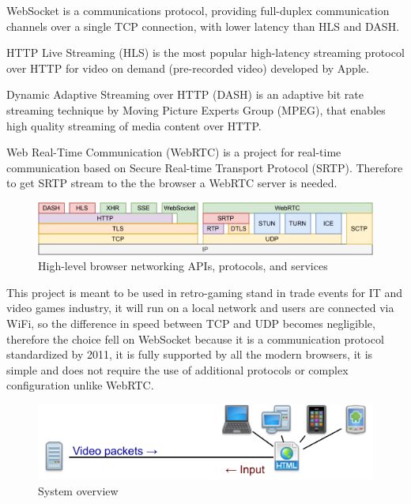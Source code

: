 WebSocket is a communications protocol, providing full-duplex communication channels over a single TCP connection, with lower latency than HLS and DASH.

HTTP Live Streaming (HLS) is the most popular high-latency streaming protocol over HTTP for video on demand (pre-recorded video) developed by Apple.

Dynamic Adaptive Streaming over HTTP (DASH) is an adaptive bit rate streaming technique by Moving Picture Experts Group (MPEG), that enables high quality streaming of media content over HTTP.

Web Real-Time Communication (WebRTC) is a project for real-time communication based on Secure Real-time Transport Protocol (SRTP). Therefore to get SRTP stream to the the browser a WebRTC server is needed\cite{High_Performance_Browser_Networking}.

\begin{figure}[H]
	\includegraphics[width=\linewidth]{immagini/webprotocols}
	\caption{High-level browser networking APIs, protocols, and services}
	\label{fig:webprotocols}
\end{figure}

This project is meant to be used in retro-gaming stand in trade events for IT and video games industry, it will run on a local network and users are connected via WiFi, so the difference in speed between TCP and UDP becomes negligible, therefore the choice fell on WebSocket because it is a communication protocol standardized by 2011, it is fully supported by all the modern browsers, it is simple and does not require the use of additional protocols or complex configuration unlike WebRTC.

\begin{figure}[H]
	\includegraphics[width=\linewidth]{immagini/proposed_system}
	\caption{System overview}
	\label{fig:proposed_system}
\end{figure}

